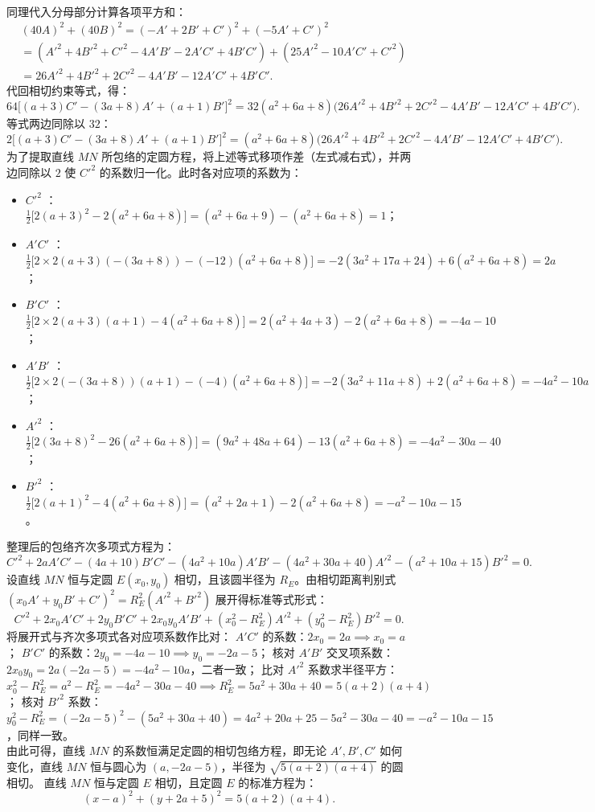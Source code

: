 \begin{solution}
\begin{align*}
\end{align*}
同理代入分母部分计算各项平方和：
\begin{align*}
&(40A)^2 + (40B)^2 = (-A' + 2B' + C')^2 + (-5A' + C')^2 \\
&= (A'^2 + 4B'^2 + C'^2 - 4A'B' - 2A'C' + 4B'C') + (25A'^2 - 10A'C' + C'^2) \\
&= 26A'^2 + 4B'^2 + 2C'^2 - 4A'B' - 12A'C' + 4B'C'.
\end{align*}
代回相切约束等式，得：
\[ 64\big[ (a+3)C' - (3a+8)A' + (a+1)B' \big]^2 = 32(a^2+6a+8)\big( 26A'^2 + 4B'^2 + 2C'^2 - 4A'B' - 12A'C' + 4B'C' \big). \]
等式两边同除以 $32$：
\[ 2\big[ (a+3)C' - (3a+8)A' + (a+1)B' \big]^2 = (a^2+6a+8)\big( 26A'^2 + 4B'^2 + 2C'^2 - 4A'B' - 12A'C' + 4B'C' \big). \]
为了提取直线 $MN$ 所包络的定圆方程，将上述等式移项作差（左式减右式），并两边同除以 $2$ 使 $C'^2$ 的系数归一化。此时各对应项的系数为：
\begin{itemize}
\item $C'^2$ ：$\frac{1}{2}\big[ 2(a+3)^2 - 2(a^2+6a+8) \big] = (a^2+6a+9) - (a^2+6a+8) = 1$；
\item $A'C'$ ：$\frac{1}{2}\big[ 2 \times 2(a+3)(-(3a+8)) - (-12)(a^2+6a+8) \big] = -2(3a^2+17a+24) + 6(a^2+6a+8) = 2a$；
\item $B'C'$ ：$\frac{1}{2}\big[ 2 \times 2(a+3)(a+1) - 4(a^2+6a+8) \big] = 2(a^2+4a+3) - 2(a^2+6a+8) = -4a-10$；
\item $A'B'$ ：$\frac{1}{2}\big[ 2 \times 2(-(3a+8))(a+1) - (-4)(a^2+6a+8) \big] = -2(3a^2+11a+8) + 2(a^2+6a+8) = -4a^2-10a$；
\item $A'^2$ ：$\frac{1}{2}\big[ 2(3a+8)^2 - 26(a^2+6a+8) \big] = (9a^2+48a+64) - 13(a^2+6a+8) = -4a^2-30a-40$；
\item $B'^2$ ：$\frac{1}{2}\big[ 2(a+1)^2 - 4(a^2+6a+8) \big] = (a^2+2a+1) - 2(a^2+6a+8) = -a^2-10a-15$。
\end{itemize}
整理后的包络齐次多项式方程为：
\[ C'^2 + 2a A'C' - (4a+10)B'C' - (4a^2+10a)A'B' - (4a^2+30a+40)A'^2 - (a^2+10a+15)B'^2 = 0. \]
设直线 $MN$ 恒与定圆 $E(x_0, y_0)$ 相切，且该圆半径为 $R_E$。由相切距离判别式 $(x_0 A' + y_0 B' + C')^2 = R_E^2(A'^2 + B'^2)$ 展开得标准等式形式：
\[ C'^2 + 2x_0 A'C' + 2y_0 B'C' + 2x_0 y_0 A'B' + (x_0^2 - R_E^2)A'^2 + (y_0^2 - R_E^2)B'^2 = 0. \]
将展开式与齐次多项式各对应项系数作比对：
$A'C'$ 的系数：$2x_0 = 2a \implies x_0 = a$；
$B'C'$ 的系数：$2y_0 = -4a-10 \implies y_0 = -2a-5$；
核对 $A'B'$ 交叉项系数：$2x_0 y_0 = 2a(-2a-5) = -4a^2-10a$，二者一致；
比对 $A'^2$ 系数求半径平方：$x_0^2 - R_E^2 = a^2 - R_E^2 = -4a^2-30a-40 \implies R_E^2 = 5a^2+30a+40 = 5(a+2)(a+4)$；
核对 $B'^2$ 系数：$y_0^2 - R_E^2 = (-2a-5)^2 - (5a^2+30a+40) = 4a^2+20a+25 - 5a^2-30a-40 = -a^2-10a-15$，同样一致。\\
由此可得，直线 $MN$ 的系数恒满足定圆的相切包络方程，即无论 $A',B',C'$ 如何变化，直线 $MN$ 恒与圆心为 $(a, -2a-5)$，半径为 $\sqrt{5(a+2)(a+4)}$ 的圆相切。
直线 $MN$ 恒与定圆 $E$ 相切，且定圆 $E$ 的标准方程为：
\[ (x - a)^2 + (y + 2a + 5)^2 = 5(a + 2)(a + 4). \]
\end{solution}


